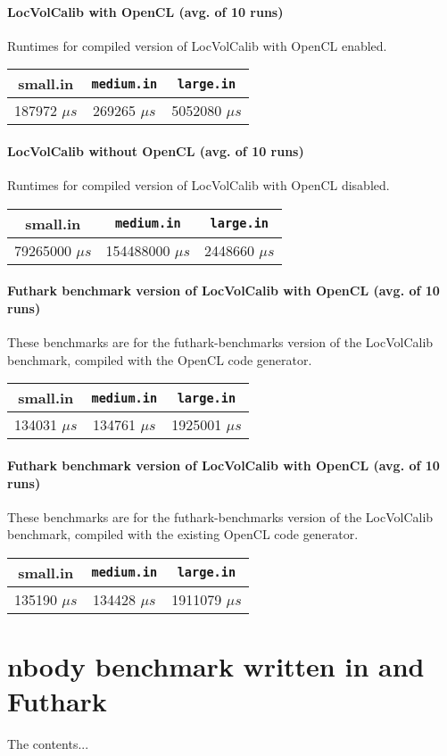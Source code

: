 \begin{appendices}
\subsubsection{\fshark{} LocVolCalib with OpenCL (avg. of 10 runs)}
Runtimes for compiled \fshark{} version of LocVolCalib with OpenCL enabled.\\
\begin{tabular}{|c|c|c|}
  \hline
  \textbf{small.in} & \texttt{medium.in} & \texttt{large.in}\\ \hline \hline
187972 $\mu s$& 269265 $\mu s$ &5052080 $\mu s$\\ \hline
\end{tabular}

\subsubsection{\fshark{} LocVolCalib without OpenCL (avg. of 10 runs)}
Runtimes for compiled \fshark{} version of LocVolCalib with OpenCL disabled.\\
\begin{tabular}{|c|c|c|}
  \hline
  \textbf{small.in} & \texttt{medium.in} & \texttt{large.in}\\ \hline \hline
79265000 $\mu s$& 154488000 $\mu s$ & 2448660 $\mu s$\\ \hline
\end{tabular}

\subsubsection{Futhark benchmark version of LocVolCalib with \csharp{} OpenCL (avg. of 10 runs)}
These benchmarks are for the futhark-benchmarks version of the LocVolCalib
benchmark, compiled with the \csharp{} OpenCL code generator.
\begin{tabular}{|c|c|c|}
  \hline
  \textbf{small.in} & \texttt{medium.in} & \texttt{large.in}\\ \hline \hline
134031 $\mu s$& 134761 $\mu s$ & 1925001 $\mu s$\\ \hline
\end{tabular}

\subsubsection{Futhark benchmark version of LocVolCalib with \C{} OpenCL (avg. of 10 runs)}
These benchmarks are for the futhark-benchmarks version of the LocVolCalib
benchmark, compiled with the existing \C{} OpenCL code generator.
\begin{tabular}{|c|c|c|}
  \hline
  \textbf{small.in} & \texttt{medium.in} & \texttt{large.in}\\ \hline \hline
135190 $\mu s$& 134428 $\mu s$ & 1911079 $\mu s$\\ \hline
\end{tabular}
\chapter{nbody benchmark written in \fshark{} and Futhark}
The contents...
\end{appendices}






